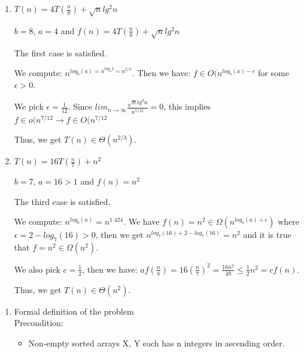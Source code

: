 \documentclass{cpsc413Solutions}
\begin{document}
\begin{problemlist}
\begin{problem}
\begin{answer}
\begin{enumerate}
    \item $T(n) = 4T(\frac{n}{8})+\sqrt{n}lg^2n$
    
     $b = 8$, $a = 4$ and $f(n) = 4T(\frac{n}{8})+\sqrt{n}lg^2n$
     
     The first case is satisfied. 
     
     We compute: $n^{log_b(a) = n^{log_8 4} = n^{2/3}}$. Then we have: $f \in O(n^{log_b(a) - \epsilon}$ for some $\epsilon > 0$. 
     
     We pick $\epsilon = \frac{1}{12}$. Since $lim_{n \xrightarrow{} \infty}\frac{\sqrt{n}lg^2n}{n^{7/12}}=0$, this implies $f \in o(n^{7/12} \longrightarrow f \in O(n^{7/12}$ 
     
     Thus, we get $T(n)\in \Theta(n^{2/3})$.
     
    
    \item $T(n) = 16T(\frac{n}{7})+n^2$
    
    $b = 7$, $a = 16 > 1$ and $f(n) = n^2$
     
     The third case is satisfied. 
     
     We compute: $n^{log_b(a)} = n^{1.424}$. We have $f(n) = n^2 \in \Omega(n^{log_b(a) + \epsilon})$ where $\epsilon = 2-log_7(16) > 0$, then we get $n^{log_7(16)+2-log_7(16)}= n^2$ and it is true that $f = n^2 \in \Omega(n^2)$.
     
     We also pick $c = \frac{1}{2}$, then we have: $af(\frac{n}{b}) = 16(\frac{n}{7})^2 = \frac{16n^2}{49} \leq \frac{1}{2}n^2 = cf(n) $.
     
     Thus, we get $T(n) \in \Theta(n^2)$.
\end{enumerate}

\end{answer}
\end{problem}


\begin{problem}
\begin{enumerate}
    \item Formal definition of the problem\\
    Precondition:
    \begin{itemize}
        \item Non-empty sorted arrays X, Y each has n integers in ascending order. 
    \end{itemize}
    

\end{enumerate}
\end{problem}
\end{problemlist}
\end{document}
